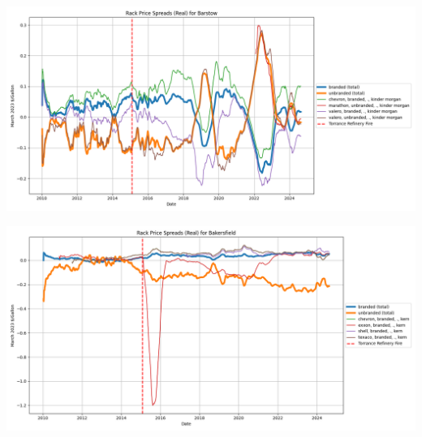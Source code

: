 \documentclass{article}
\begin{document}
\includegraphics[width=7in]{barstow_spread.png}

\includegraphics[width=7in]{bakersfield_spread.png}
\end{document}
